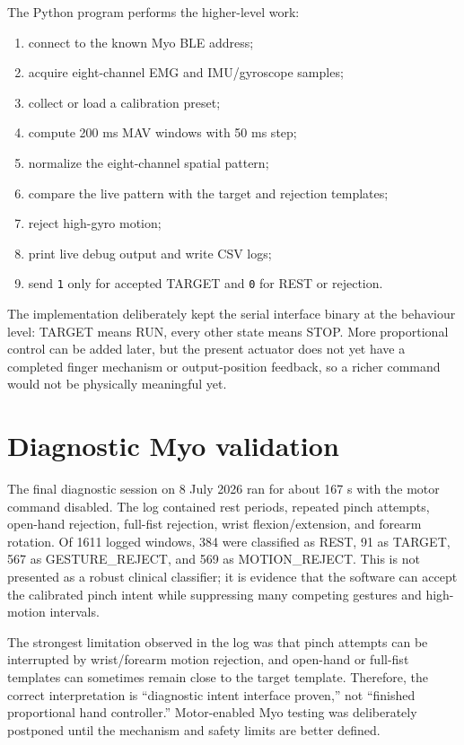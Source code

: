 \documentclass[11pt,a4paper]{report}
\begin{document}
The Python program performs the higher-level work:

\begin{enumerate}
  \item connect to the known Myo BLE address;
  \item acquire eight-channel EMG and IMU/gyroscope samples;
  \item collect or load a calibration preset;
  \item compute 200 ms MAV windows with 50 ms step;
  \item normalize the eight-channel spatial pattern;
  \item compare the live pattern with the target and rejection templates;
  \item reject high-gyro motion;
  \item print live debug output and write CSV logs;
  \item send \texttt{1} only for accepted TARGET and \texttt{0} for REST or rejection.
\end{enumerate}

The implementation deliberately kept the serial interface binary at the behaviour level: TARGET means RUN, every other state means STOP. More proportional control can be added later, but the present actuator does not yet have a completed finger mechanism or output-position feedback, so a richer command would not be physically meaningful yet.

\section{Diagnostic Myo validation}

The final diagnostic session on 8 July 2026 ran for about 167 s with the motor command disabled. The log contained rest periods, repeated pinch attempts, open-hand rejection, full-fist rejection, wrist flexion/extension, and forearm rotation. Of 1611 logged windows, 384 were classified as REST, 91 as TARGET, 567 as GESTURE\_REJECT, and 569 as MOTION\_REJECT. This is not presented as a robust clinical classifier; it is evidence that the software can accept the calibrated pinch intent while suppressing many competing gestures and high-motion intervals.

The strongest limitation observed in the log was that pinch attempts can be interrupted by wrist/forearm motion rejection, and open-hand or full-fist templates can sometimes remain close to the target template. Therefore, the correct interpretation is ``diagnostic intent interface proven,'' not ``finished proportional hand controller.'' Motor-enabled Myo testing was deliberately postponed until the mechanism and safety limits are better defined.
\end{document}
